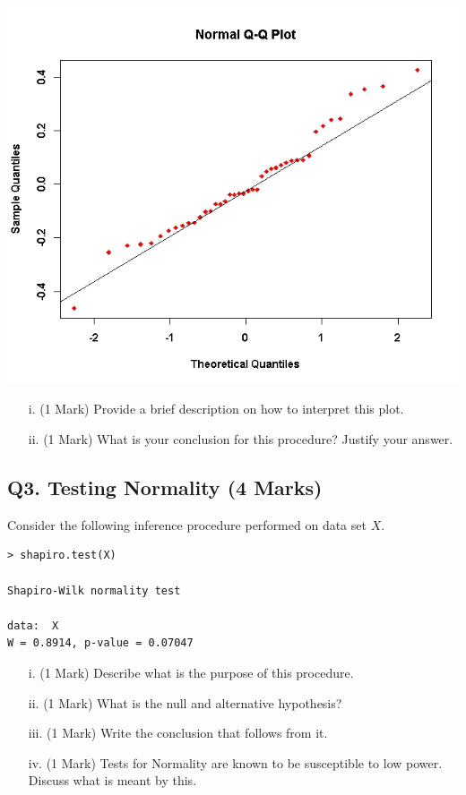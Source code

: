 \documentclass[a4paper,12pt]{article}
\begin{document}
\begin{center}
\includegraphics[scale=0.45]{images/ExamQ5qqplot}
\end{center}

\begin{itemize}
	\item[i.] (1 Mark) Provide a brief description on how to interpret this plot.
	\item[ii.] (1 Mark) What is your conclusion for this procedure? Justify your answer.
\end{itemize}

\subsection*{Q3. Testing Normality (4 Marks)} %
Consider the following inference procedure performed on data set $X$.

\begin{framed}
	\begin{verbatim}
> shapiro.test(X)

Shapiro-Wilk normality test

data:  X
W = 0.8914, p-value = 0.07047

	\end{verbatim}

\end{framed}

\begin{itemize}
	\item[i.] (1 Mark) Describe what is the purpose of this procedure.
	\item[ii.] (1 Mark) What is the null and alternative hypothesis?
	\item[iii.] (1 Mark) Write the conclusion that follows from it.
	\item[iv.] (1 Mark) Tests for Normality are known to be susceptible to low power. Discuss what is meant by this.
\end{itemize}
\end{document}
